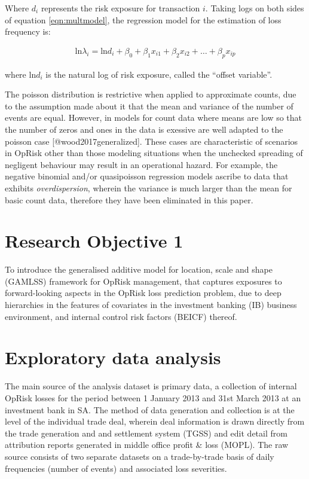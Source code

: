 \documentclass[]{article}
\begin{document}
Where \(d_i\) represents the risk exposure for transaction \(i\). Taking
logs on both sides of equation \ref{eqn:multmodel}, the regression model
for the estimation of loss frequency is:

\singlespacing

\begin{eqnarray}
\mbox{ln}\lambda_i =  \mbox{ln}d_i + \beta_0 + \beta_1x_{i1} + \beta_2x_{i2} + \ldots + \beta_px_{ip}
\end{eqnarray} \doublespacing

where \(\mbox{ln}d_i\) is the natural log of risk exposure, called the
``offset variable''.

The poisson distribution is restrictive when applied to approximate
counts, due to the assumption made about it that the mean and variance
of the number of events are equal. However, in models for count data
where means are low so that the number of zeros and ones in the data is
exessive are well adapted to the poisson case
{[}@wood2017generalized{]}. These cases are characteristic of scenarios
in OpRisk other than those modeling situations when the unchecked
spreading of negligent behaviour may result in an operational hazard.
For example, the negative binomial and/or quasipoisson regression models
ascribe to data that exhibits \emph{overdispersion}, wherein the
variance is much larger than the mean for basic count data, therefore
they have been eliminated in this paper.

\section{Research Objective 1}
\label{sec:Research Objective 1}

To introduce the generalised additive model for location, scale and
shape (GAMLSS) framework for OpRisk management, that captures exposures
to forward-looking aspects in the OpRisk loss prediction problem, due to
deep hierarchies in the features of covariates in the investment banking
(IB) business environment, and internal control risk factors (BEICF)
thereof.

\section{Exploratory data analysis}
\label{sec:Exploratory data analysis}

The main source of the analysis dataset is primary data, a collection of
internal OpRisk losses for the period between 1 January 2013 and 31st
March 2013 at an investment bank in SA. The method of data generation
and collection is at the level of the individual trade deal, wherein
deal information is drawn directly from the trade generation and and
settlement system (TGSS) and edit detail from attribution reports
generated in middle office profit \& loss (MOPL). The raw source
consists of two separate datasets on a trade-by-trade basis of daily
frequencies (number of events) and associated loss severities.\medskip
\end{document}
